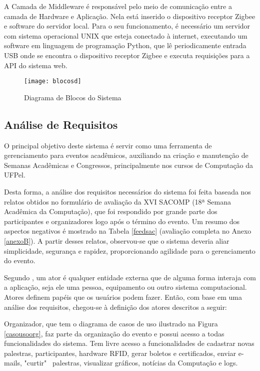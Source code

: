 \documentclass[tcc,capa]{texufpel}
\begin{document}
        
        A Camada de Middleware é responsável pelo meio de comunicação entre a camada de Hardware e Aplicação. Nela está inserido o dispositivo receptor Zigbee e software do servidor local. Para o seu funcionamento, é necessário um servidor com sistema operacional UNIX que esteja conectado à internet, executando um software em linguagem de programação Python, que lê periodicamente entrada USB onde se encontra o dispositivo receptor Zigbee e executa requisições para a API do sistema web.
        
        \begin{figure}[H]
            \centering \texttt{[image: blocosd]}
            \caption{Diagrama de Blocos do Sistema} 
            \label{diagrama}
        \end{figure}
    
    
        \subsection{Análise de Requisitos}
        
            O principal objetivo deste sistema é servir como uma ferramenta de gerenciamento para eventos acadêmicos, auxiliando na criação e manutenção de Semanas Acadêmicas e Congressos, principalmente nos cursos de Computação da UFPel.
            
            Desta forma, a análise dos requisitos necessários do sistema foi feita baseada nos relatos obtidos no formulário de avaliação da XVI SACOMP (18ª Semana Acadêmica da Computação), que foi respondido por grande parte dos participantes e organizadores logo após o término do evento. Um resumo dos aspectos negativos é mostrado na Tabela \ref{feedsac} (avaliação completa no Anexo \ref{anexoB}).
            A partir desses relatos, observou-se que o sistema deveria aliar simplicidade, segurança e rapidez, proporcionando agilidade para o gerenciamento do evento.
            
            Segundo  \cite{booch1999unified}, um ator é qualquer entidade externa que de alguma forma interaja com a aplicação, seja ele uma pessoa, equipamento ou outro sistema computacional. Atores definem papéis que os usuários podem fazer. Então, com base em uma análise dos requisitos, chegou-se à definição dos atores descritos a seguir:
            
            
            Organizador, que tem o diagrama de casos de uso ilustrado na Figura \ref{casousoorg}, faz parte da organização do evento e possui acesso a todas funcionalidades do sistema. Tem livre acesso a funcionalidades de cadastrar novas palestras, participantes, hardware RFID, gerar boletos e certificados, enviar e-mails, "curtir"~ palestras, visualizar gráficos, notícias da Computação e logs.
            
\end{document}
